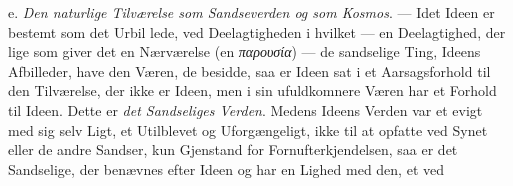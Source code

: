 \documentclass[12pt,a4paper]{book}
\newcommand{\gk}[1]{\textit{#1}}
\begin{document}
e. \emph{Den naturlige Tilværelse som Sandseverden og som
Kosmos}. --- Idet Ideen er bestemt som det Urbil\-%
lede, ved Deelagtigheden i hvilket --- en Deelagtighed, der lige\-%
som giver det en Nærværelse (en \gk{παρουσία}) --- de sandselige
Ting, Ideens Afbilleder, have den Væren, de besidde, saa er
Ideen sat i et Aarsagsforhold til den Tilværelse, der ikke er
Ideen, men i sin ufuldkomnere Væren har et Forhold til Ideen.
Dette er \emph{det Sandseliges Verden}. Medens Ideens Verden
var et evigt med sig selv Ligt, et Utilblevet og Uforgængeligt,
ikke til at opfatte ved Synet eller de andre Sandser, kun
Gjenstand for Fornufterkjendelsen, saa er det Sandselige, der
benævnes efter Ideen og har en Lighed med den, et ved
\end{document}
